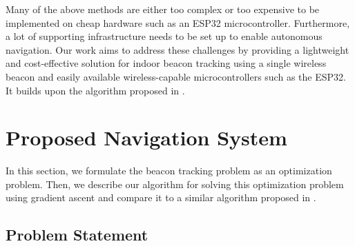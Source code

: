 \documentclass[conference]{IEEEtran}
\begin{document}
Many of the above methods are either too complex or too expensive to be
implemented on cheap hardware such as an ESP32 microcontroller. Furthermore, a
lot of supporting infrastructure needs to be set up to enable autonomous
navigation. Our work aims to address these challenges by providing a lightweight
and cost-effective solution for indoor beacon tracking using a single wireless
beacon and easily available wireless-capable microcontrollers such as the ESP32.
It builds upon the algorithm proposed in
\cite{sachinkumaromprakashdubeyNavigationCommunicationUGV2022}.

\section{Proposed Navigation System}
\label{sec:proposed-system}

In this section, we formulate the beacon tracking problem as an optimization
problem. Then, we describe our algorithm for solving this optimization problem
using gradient ascent and compare it to a similar algorithm proposed in
\cite{sachinkumaromprakashdubeyNavigationCommunicationUGV2022}.

\subsection{Problem Statement}
\label{subsec:problem-statement}
\end{document}
